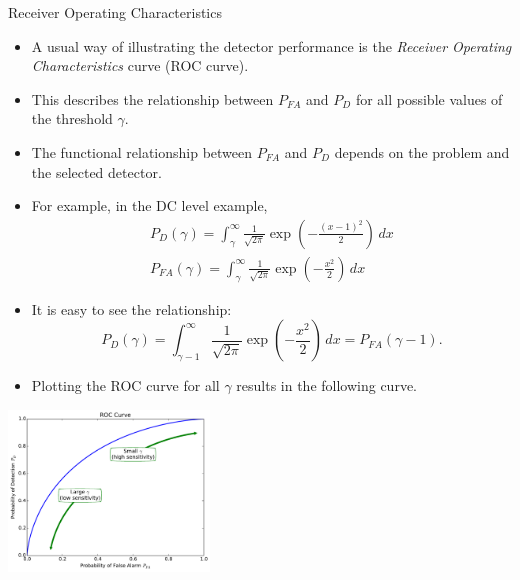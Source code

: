\documentclass[10pt, aspectratio=169]{beamer} %
\begin{document}
\begin{frame}[allowframebreaks=0.8]
 {Receiver Operating Characteristics}
\begin{itemize}
\item A usual way of illustrating the detector performance is the
\emph{Receiver Operating Characteristics} curve (ROC curve).
\item This describes the relationship between $P_{FA}$ and $P_D$
for all possible values of the threshold $\gamma$.
\item The functional relationship between $P_{FA}$ and $P_D$
depends on the problem and the selected detector.
\item For example, in the DC level example, 
\begin{align*}
P_D(\gamma) = \int_{\gamma}^{\infty} \frac{1}{\sqrt{2\pi}}\exp\left(-\frac{(x-1)^2}{2}\right)\,dx\\
P_{FA}(\gamma) = \int_{\gamma}^{\infty} \frac{1}{\sqrt{2\pi}}\exp\left(-\frac{x^2}{2}\right)\,dx
\end{align*}
\item It is easy to see the relationship:
\[
P_D(\gamma) = \int_{\gamma-1}^{\infty} \frac{1}{\sqrt{2\pi}}\exp\left(-\frac{x^2}{2}\right)\,dx = P_{FA}(\gamma-1).
\]
\item Plotting the ROC curve for all $\gamma$ results in the following
curve.

\end{itemize}
\centerline{\includegraphics[width=0.4\textwidth]{RocCurve.pdf}}

\end{frame}
\end{document}
